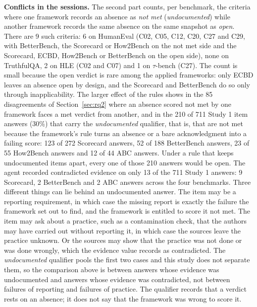 \documentclass[10pt,conference]{IEEEtran}
\begin{document}
\textbf{Conflicts in the sessions.} The second part counts, per benchmark, the criteria where one framework records an absence as \emph{not met} (\emph{undocumented}) while another framework records the same absence on the same snapshot as \emph{open}. There are 9 such criteria: 6 on HumanEval (C02, C05, C12, C20, C27 and C29, with BetterBench, the Scorecard or How2Bench on the not met side and the Scorecard, ECBD, How2Bench or BetterBench on the open side), none on TruthfulQA, 2 on HLE (C02 and C07) and 1 on $\tau$-bench (C27). The count is small because the open verdict is rare among the applied frameworks: only ECBD leaves an absence open by design, and the Scorecard and BetterBench do so only through inapplicability. The larger effect of the rules shows in the 85 disagreements of Section~\ref{sec:rq2} where an absence scored not met by one framework faces a met verdict from another, and in the 210 of 711 Study 1 item answers (30\%) that carry the \emph{undocumented} qualifier, that is, that are not met because the framework's rule turns an absence or a bare acknowledgment into a failing score: 123 of 272 Scorecard answers, 52 of 188 BetterBench answers, 23 of 55 How2Bench answers and 12 of 44 ABC answers. Under a rule that keeps undocumented items apart, every one of those 210 answers would be open. The agent recorded contradicted evidence on only 13 of the 711 Study 1 answers: 9 Scorecard, 2 BetterBench and 2 ABC answers across the four benchmarks. Three different things can lie behind an undocumented answer. The item may be a reporting requirement, in which case the missing report is exactly the failure the framework set out to find, and the framework is entitled to score it not met. The item may ask about a practice, such as a contamination check, that the authors may have carried out without reporting it, in which case the sources leave the practice unknown. Or the sources may show that the practice was not done or was done wrongly, which the evidence value records as contradicted. The \emph{undocumented} qualifier pools the first two cases and this study does not separate them, so the comparison above is between answers whose evidence was undocumented and answers whose evidence was contradicted, not between failures of reporting and failures of practice. The qualifier records that a verdict rests on an absence; it does not say that the framework was wrong to score it.
\end{document}

